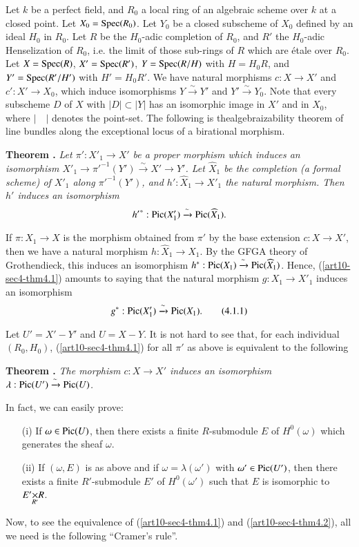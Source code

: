Let $k$ be a perfect field, and $R_{0}$ a local ring of an algebraic scheme over $k$ at a closed point. Let $X_{0}=\operatorname{Spec} (R_{0})$. Let $Y_{0}$ be a closed subscheme of $X_{0}$ defined by an ideal $H_{0}$ in $R_{0}$. Let $R$ be the $H_{0}$-adic completion of $R_{0}$, and $R'$ the $H_{0}$-adic Henselization of $R_{0}$, i.e. the limit of those sub-rings of $R$ which are \'etale over $R_{0}$. Let $X=\operatorname{Spec} (R)$, $X'=\operatorname{Spec} (R')$, $Y=\operatorname{Spec} (R/H)$ with $H=H_{0}R$, and $Y'=\operatorname{Spec} (R'/H')$ with $H'=H_{0}R'$. We have natural morphisms $c:X\to X'$ and $c':X'\to X_{0}$, which induce isomorphisms $Y\xrightarrow{\sim}Y'$ and $Y'\xrightarrow{\sim}Y_{0}$. Note that every subscheme $D$ of $X$ with $|D|\subset |Y|$ has an isomorphic image in $X'$ and in $X_{0}$, where $|\quad|$ denotes the point-set. The following is the\pageoriginale algebraizability theorem of line bundles along the exceptional locus of a birational morphism.

\medskip
\noindent
{\bf Theorem .\label{art10-sec4-thm4.1}}
{\em Let $\pi':X'_{1}\to X'$ be a proper morphism which induces an isomorphism $X'_{1}\to {\pi'}^{-1}(Y')\xrightarrow{\sim}X'\to Y'$. Let $\widehat{X}_{1}$ be the completion (a formal scheme) of $X'_{1}$ along ${\pi'}^{-1}(Y')$, and $h':\widehat{X}_{1}\to X'_{1}$ the natural morphism. Then $h'$ induces an isomorphism}
$$
{h'}^{*}:\operatorname{\mathrm{Pic}} (X'_{1})\xrightarrow{\sim}\operatorname{\mathrm{Pic}}(\widehat{X}_{1}).
$$

If $\pi:X_{1}\to X$ is the morphism obtained from $\pi'$ by the base extension $c:X\to X'$, then we have a natural morphism $h:\widehat{X}_{1}\to X_{1}$. By the GFGA theory of Grothendieck, this induces an isomorphism $h^{*}:\operatorname{\mathrm{Pic}}(X_{1})\xrightarrow{\sim}\operatorname{\mathrm{Pic}}(\widehat{X}_{1})$. Hence, (\ref{art10-sec4-thm4.1}) amounts to saying that the natural morphism $g:X_{1}\to X'_{1}$ induces an isomorphism
\begin{equation*}
g^{*}:\operatorname{\mathrm{Pic}}(X'_{1})\xrightarrow{\sim}\operatorname{\mathrm{Pic}}(X_{1}).\tag{4.1.1}\label{art10-sec4-eq4.1.1}
\end{equation*}

Let $U'=X'-Y'$ and $U=X-Y$. It is not hard to see that, for each individual $(R_{0},H_{0})$, (\ref{art10-sec4-thm4.1}) for all $\pi'$ as above is equivalent to the following

\medskip
\noindent
{\bf Theorem .\label{art10-sec4-thm4.2}}
{\em The morphism $c:X\to X'$ induces an isomorphism $\lambda:\operatorname{\mathrm{Pic}}(U')\xrightarrow{\sim}\operatorname{\mathrm{Pic}}(U)$.}

In fact, we can easily prove:
\begin{itemize}
\item[(i)] If $\omega\in \operatorname{\mathrm{Pic}}(U)$, then there exists a finite $R$-submodule $E$ of $H^{0}(\omega)$ which generates the sheaf $\omega$.

\item[(ii)] If $(\omega,E)$ is as above and if $\omega=\lambda(\omega')$ with $\omega'\in \operatorname{\mathrm{Pic}}(U')$, then there exists a finite $R'$-submodule $E'$ of $H^{0}(\omega')$ such that $E$ is isomorphic to $\fprod{E'}{R}{R'}$.
\end{itemize}
Now, to see the equivalence of (\ref{art10-sec4-thm4.1}) and (\ref{art10-sec4-thm4.2}), all we need is the following ``Cramer's rule''.

